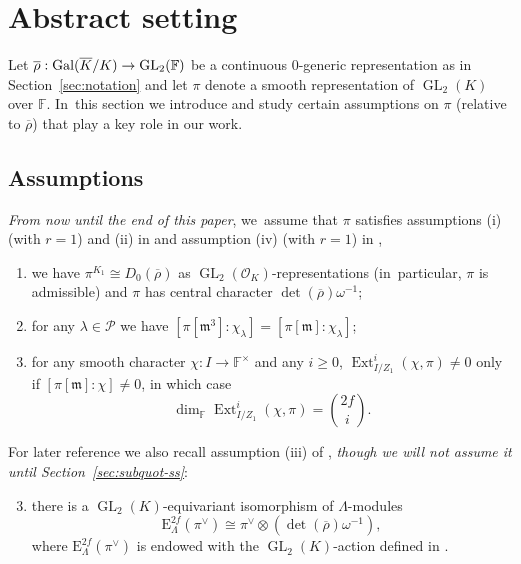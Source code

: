 \documentclass[JEP,XML,SOM,Unicode,NoFloatCountersInSection, NoEqCountersInSection,published]{cedram}
\let\ovl\overline
\newcommand{\F}{\mathbb{F}}
\newcommand{\cO}{\mathcal{O}}
\renewcommand{\P}{\mathscr P}
\newcommand{\EE}{\mathrm{E}}
\newcommand{\fm}{\mathfrak{m}}\let\m\fm
\newcommand{\rhobar}{\overline{\rho}}
\newcommand{\brho}{\overline{\rho}}
\DeclareMathOperator{\Ext}{Ext}
\DeclareMathOperator{\Gal}{Gal}
\DeclareMathOperator{\GL}{GL}
\theoremstyle{plain}
\theoremstyle{definition}
\begin{document}
\section{Abstract setting}
\label{sec:abstract-setting}

Let $\rhobar:\Gal(\ovl K/K)\ra\GL_2(\F)$ be a continuous $0$-generic representation as in Section~\ref{sec:notation} and let $\pi$ denote a smooth representation of $\GL_2(K)$ over $\F$. In~this section we introduce and study certain assumptions on $\pi$ (relative to $\brho$) that play a key role in our work.

\subsection{Assumptions}
\label{subsec:assumptions}

\emph{From now until the end of this paper}, we~assume that $\pi$ satisfies assumptions (i) (with $r = 1$) and (ii) in \cite[\S 3.3.2]{BHHMS2} and assumption (iv) (with $r = 1$) in \cite[\S 2.1]{BHHMS4}, \ie

\begin{enumerate}
\item\label{it:assum-i} we have $\pi^{K_1}\cong D_0(\rhobar)$ as $\GL_2(\cO_K)$-representations (in~particular, $\pi$ is admissible) and $\pi$ has central character $\det(\rhobar)\omega^{-1}$;
\item\label{it:assum-ii} for any $\lambda\in\P$ we have $[\pi[\fm^3]:\chi_\lambda]=[\pi[\fm]:\chi_\lambda]$;

\setcounter{enumi}{3}
\item\label{it:assum-iv} for any smooth character $\chi:I\to \F^{\times}$ and any $i \ge 0$, $\Ext^i_{I/Z_1}(\chi,\pi)\neq0 $ only if
$[\pi[\m]:\chi]\neq0$, in which case
\[
\dim_{\F}\Ext^i_{I/Z_1}(\chi,\pi)=\binom{2f}{i}.
\]
\end{enumerate}

For later reference we also recall assumption (iii) of \cite[\S 3.3.5]{BHHMS2}, \emph{though we will not assume it until Section~\ref{sec:subquot-ss}}:
\begin{enumerate}\setcounter{enumi}{2}
\item\label{it:assum-iii} there is a $\GL_2(K)$-equivariant isomorphism of $\Lambda$-modules
\[
\EE^{2f}_\Lambda(\pi^\vee) \cong \pi^\vee\otimes (\det(\rhobar)\omega^{-1}),
\]
where $\EE^{2f}_\Lambda(\pi^\vee)$ is endowed with the $\GL_2(K)$-action defined in \cite[Prop.\,3.2]{Ko}.
\end{enumerate}
\end{document}

